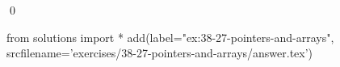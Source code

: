 
\begin{ex}
  \label{ex:38-27-pointers-and-arrays}
  
  \qed
\end{ex}
\begin{python0}
from solutions import *
add(label="ex:38-27-pointers-and-arrays",
    srcfilename='exercises/38-27-pointers-and-arrays/answer.tex')
\end{python0}
